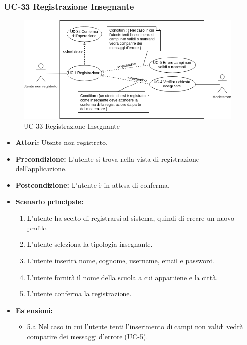 \subsubsection{UC-33 Registrazione Insegnante}
\begin{figure}[h]
	\centering
	\includegraphics[scale=0.7]{images/UC-1.png}
	\caption{UC-33 Registrazione Insegnante}
\end{figure}	

\begin{itemize}
	\item \textbf{Attori: }Utente non registrato.
	\item \textbf{Precondizione: }L'utente si trova nella vista di registrazione dell'applicazione.
	\item \textbf{Postcondizione: }L'utente è in attesa di conferma.
	\item \textbf{Scenario principale: }
	\begin{enumerate}
		\item L'utente ha scelto di registrarsi al sistema, quindi di creare un nuovo profilo. 
		\item L'utente seleziona la tipologia insegnante. 
		\item L'utente inserirà nome, cognome, username, email e password.
		\item L'utente fornirà il nome della scuola a cui appartiene e la città.
		\item L'utente conferma la registrazione.
	\end{enumerate}
	\item \textbf{Estensioni: }
	\begin{itemize}
		\item 5.a Nel caso in cui l'utente tenti l'inserimento di campi non validi vedrà comparire dei messaggi d'errore (UC-5).
	\end{itemize}
\end{itemize}

